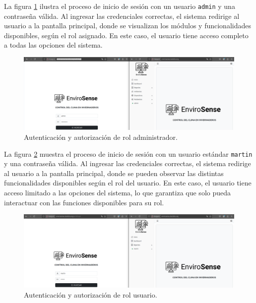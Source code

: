 La figura \ref{fig:login_correcto_admin} ilustra el proceso de inicio de sesión
con un usuario \texttt{admin} y una contraseña válida. Al ingresar las
credenciales correctas, el sistema redirige al usuario a la pantalla principal,
donde se visualizan los módulos y funcionalidades disponibles, según el rol
asignado. En este caso, el usuario tiene acceso completo a todas las opciones
del sistema.

\begin{figure}[H]
    \centering
    \includegraphics[width=\textwidth]{Images/42_login_correcto_admin.png}
    \caption[Autenticación y autorización rol administrador]{Autenticación y autorización de rol administrador.}
    \label{fig:login_correcto_admin}
\end{figure}

La figura \ref{fig:login_correcto_user} muestra el proceso de inicio de sesión
con un usuario estándar \texttt{martin} y una contraseña válida. Al ingresar
las credenciales correctas, el sistema redirige al usuario a la pantalla
principal, donde se pueden observar las distintas funcionalidades disponibles
según el rol del usuario. En este caso, el usuario tiene acceso limitado a las
opciones del sistema, lo que garantiza que solo pueda interactuar con las
funciones disponibles para su rol.

\begin{figure}[H]
    \centering
    \includegraphics[width=\textwidth]{Images/43_login_correcto_user.png}
    \caption[Autenticación y autorización rol usuario]{Autenticación y autorización de rol usuario.}
    \label{fig:login_correcto_user}
\end{figure}

